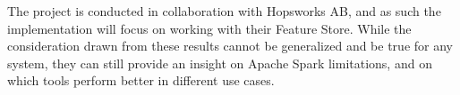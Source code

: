 The project is conducted in collaboration with Hopsworks AB, and as such the implementation will focus on working with their Feature Store. While the consideration drawn from these results cannot be generalized and be true for any system, they can still provide an insight on Apache Spark limitations, and on which tools perform better in different use cases. 